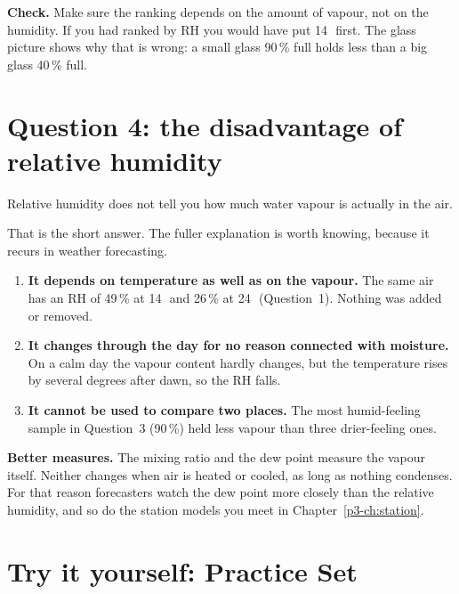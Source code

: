 \textbf{Check.} Make sure the ranking depends on the amount of vapour, not on the humidity. If you had ranked by RH you would have put 14\,\degC\ first. The glass picture shows why that is wrong: a small glass 90\,\% full holds less than a big glass 40\,\% full.

\section{Question 4: the disadvantage of relative humidity}\label{p3-sec:q4}

\begin{answerbox}
Relative humidity does not tell you how much water vapour is actually in the air.
\end{answerbox}

That is the short answer. The fuller explanation is worth knowing, because it recurs in weather forecasting.

\begin{enumerate}[label=\textbf{\arabic*.}]
\item \textbf{It depends on temperature as well as on the vapour.} The same air has an RH of 49\,\% at 14\,\degC\ and 26\,\% at 24\,\degC\ (Question~1). Nothing was added or removed.
\item \textbf{It changes through the day for no reason connected with moisture.} On a calm day the vapour content hardly changes, but the temperature rises by several degrees after dawn, so the RH falls.
\item \textbf{It cannot be used to compare two places.} The most humid-feeling sample in Question~3 (90\,\%) held less vapour than three drier-feeling ones.
\end{enumerate}

\textbf{Better measures.} The mixing ratio and the dew point measure the vapour itself. Neither changes when air is heated or cooled, as long as nothing condenses. For that reason forecasters watch the dew point more closely than the relative humidity, and so do the station models you meet in Chapter~\ref{p3-ch:station}.

\section{Try it yourself: Practice Set~\thechapter}

